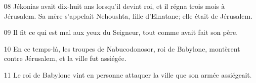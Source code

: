 08 Jékonias avait dix-huit ans lorsqu’il devint roi, et il régna trois mois à Jérusalem. Sa mère s’appelait Nehoushta, fille d’Elnatane; elle était de Jérusalem.

09 Il fit ce qui est mal aux yeux du Seigneur, tout comme avait fait son père.

10 En ce temps-là, les troupes de Nabucodonosor, roi de Babylone, montèrent contre Jérusalem, et la ville fut assiégée.

11 Le roi de Babylone vint en personne attaquer la ville que son armée assiégeait.
